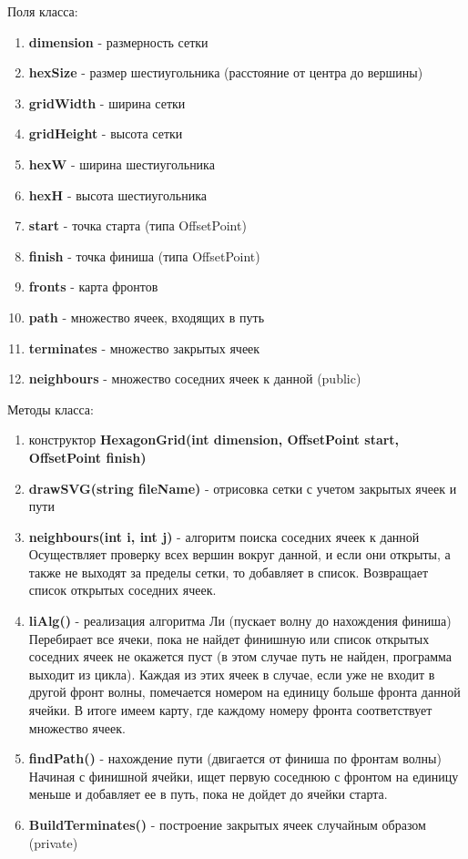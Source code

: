 \begin{enumerate}
	Поля класса:
	\begin {enumerate}
	\item \textbf{dimension} - размерность сетки
	\item \textbf{hexSize} - размер шестиугольника (расстояние от центра до вершины)
	\item \textbf{gridWidth} - ширина сетки
	\item \textbf{gridHeight} - высота сетки
	\item \textbf{hexW} - ширина шестиугольника
	\item \textbf{hexH} - высота шестиугольника
	\item \textbf{start} - точка старта (типа OffsetPoint)
	\item \textbf{finish} - точка финиша (типа OffsetPoint)
	\item \textbf{fronts} - карта фронтов
	\item \textbf{path} - множество ячеек, входящих в путь
	\item \textbf{terminates} - множество закрытых ячеек
	\item \textbf{neighbours} - множество соседних ячеек к данной (public)
	\end {enumerate}
	Методы класса:
	\begin {enumerate}
	\item конструктор \textbf{HexagonGrid(int dimension, OffsetPoint start, OffsetPoint finish)}
	\item \textbf{drawSVG(string fileName)} - отрисовка сетки с учетом закрытых ячеек и пути
	\item \textbf{neighbours(int i, int j)} - алгоритм поиска соседних ячеек к данной 
	Осуществляет проверку всех вершин вокруг данной, и если они
	открыты, а также не выходят за пределы сетки, то добавляет в список. Возвращает список открытых
	соседних ячеек.
	\item \textbf{liAlg()} - реализация алгоритма Ли (пускает волну до нахождения финиша)
	Перебирает все ячеки, пока не найдет финишную или список открытых соседних ячеек не окажется пуст (в этом случае
	путь не найден, программа выходит из цикла).
	Каждая из этих ячеек в случае, если уже не входит в другой фронт волны, помечается номером на единицу 
	больше фронта данной ячейки. В итоге имеем карту, где каждому номеру фронта соответствует множество ячеек.
	
	\item \textbf{findPath()} - нахождение пути (двигается от финиша по фронтам волны)
	Начиная с финишной ячейки, ищет первую соседнюю с фронтом на единицу меньше и 
	добавляет ее в путь, пока не дойдет до ячейки старта.
	\item \textbf{BuildTerminates()} - построение закрытых ячеек случайным образом (private) 
	\end {enumerate}
\end {enumerate}
	



